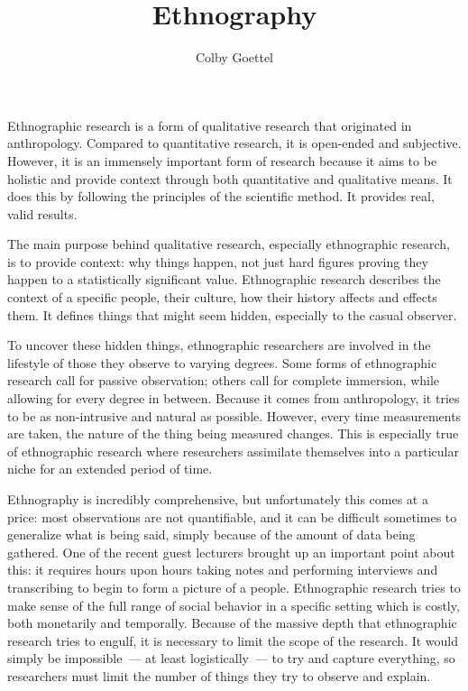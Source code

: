 \documentclass[12pt]{article}
\title{Ethnography}
\author{Colby Goettel}
\begin{document}
\maketitle



Ethnographic research is a form of qualitative research that originated in anthropology. Compared to quantitative research, it is open-ended and subjective. However, it is an immensely important form of research because it aims to be holistic and provide context through both quantitative and qualitative means. It does this by following the principles of the scientific method. It provides real, valid results.

The main purpose behind qualitative research, especially ethnographic research, is to provide context: why things happen, not just hard figures proving they happen to a statistically significant value. Ethnographic research describes the context of a specific people, their culture, how their history affects and effects them. It defines things that might seem hidden, especially to the casual observer.

To uncover these hidden things, ethnographic researchers are involved in the lifestyle of those they observe to varying degrees. Some forms of ethnographic research call for passive observation; others call for complete immersion, while allowing for every degree in between. Because it comes from anthropology, it tries to be as non-intrusive and natural as possible. However, every time measurements are taken, the nature of the thing being measured changes. This is especially true of ethnographic research where researchers assimilate themselves into a particular niche for an extended period of time.

Ethnography is incredibly comprehensive, but unfortunately this comes at a price: most observations are not quantifiable, and it can be difficult sometimes to generalize what is being said, simply because of the amount of data being gathered. One of the recent guest lecturers brought up an important point about this: it requires hours upon hours taking notes and performing interviews and transcribing to begin to form a picture of a people. Ethnographic research tries to make sense of the full range of social behavior in a specific setting which is costly, both monetarily and temporally. Because of the massive depth that ethnographic research tries to engulf, it is necessary to limit the scope of the research. It would simply be impossible~--- at least logistically~--- to try and capture everything, so researchers must limit the number of things they try to observe and explain.
\end{document}
